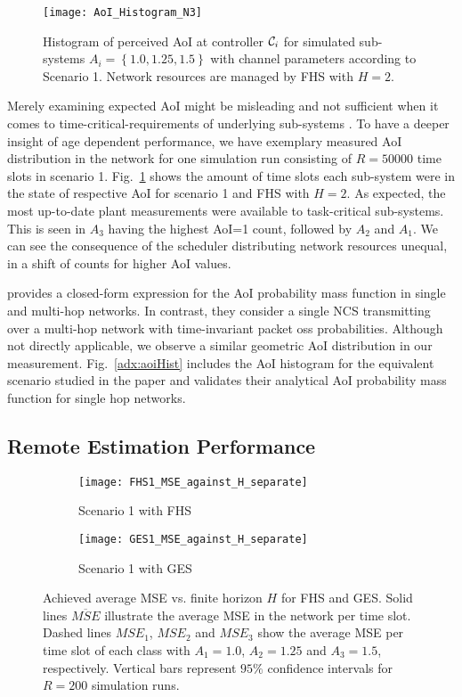 \begin{figure}[htb]
  \centering
  \texttt{[image: AoI\_Histogram\_N3]}
  \caption[Scenario 1: Measurement of AoI distribution]{Histogram of perceived
  AoI at controller $\mathcal{C}_i$ for simulated sub-systems $A_i=\left\{1.0,
  1.25, 1.5\right\}$ with channel parameters according to Scenario 1. Network
  resources are managed by FHS with $H=2$.} 
  \label{fig:AoIHist}
\end{figure}

Merely examining expected AoI might be misleading and not sufficient when it
comes to time-critical-requirements of underlying sub-systems
\cite{ayan2020probability}. To have a deeper insight of age dependent
performance, we have exemplary measured AoI distribution in the network for one
simulation run consisting of $R=50000$ time slots in scenario 1.
Fig.~\ref{fig:AoIHist} shows the amount of time slots each sub-system were in
the state of respective AoI for scenario 1 and FHS with $H=2$. As expected, the
most up-to-date plant measurements were available to task-critical sub-systems.
This is seen in $A_3$ having the highest AoI=1 count, followed by $A_2$ and
$A_1$. We can see the consequence of the scheduler distributing network
resources unequal, in a shift of counts for higher AoI values. 
  
\cite{ayan2020probability} provides a closed-form expression for the AoI
probability mass function in single and multi-hop networks. In contrast, they
consider a single NCS transmitting over a multi-hop network with time-invariant
packet oss probabilities. Although not directly applicable, we observe a similar
geometric AoI distribution in our measurement. Fig.~\ref{adx:aoiHist} includes
the AoI histogram for the equivalent scenario studied in the paper and validates
their analytical AoI probability mass function for single hop networks.

\subsection{Remote Estimation Performance}

\begin{figure}[htb]
  \centering
  \begin{subfigure}{0.49\textwidth}
    \centering
    \texttt{[image: FHS1\_MSE\_against\_H\_separate]}
    \caption{Scenario 1 with FHS}
    \label{fig:surprise}
  \end{subfigure}
  \hfill
  \begin{subfigure}{0.5\textwidth}
    \centering
    \texttt{[image: GES1\_MSE\_against\_H\_separate]}
    \caption{Scenario 1 with GES}
  \end{subfigure}
  \caption[Scenario 1: Average MSE vs. finite horizon $H$]{Achieved average
  MSE vs. finite horizon $H$ for FHS and GES. Solid lines $\overline{MSE}$
  illustrate the average MSE in the network per time slot. Dashed lines
  $MSE_1$, $MSE_2$ and $MSE_3$ show the average MSE per time slot of each
  class with $A_1=1.0$, $A_2=1.25$ and $A_3=1.5$, respectively. Vertical bars
  represent $95\%$ confidence intervals for $R=200$ simulation runs.}
  \label{fig:MSEavg}
\end{figure}

